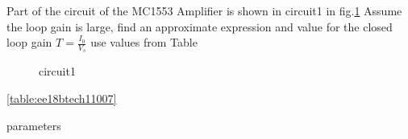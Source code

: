 \begin{enumerate}[label=\thesubsection.\arabic*.,ref=\thesubsection.\theenumi]
{\small
 \item Part of the circuit of the MC1553 Amplifier is shown in circuit1 in  fig.\ref{fig:circuit1} Assume the loop gain is large, find an approximate expression and value for the closed loop gain $T=\frac{I_0}{V_s}$ use values from Table
 \begin{figure}[!ht]
	\begin{center}
		
		\resizebox{\columnwidth}{!}{}
	\end{center}
\caption{circuit1}
\label{fig:circuit1}
\end{figure}
 \ref{table:ee18btech11007}
\begin{table}[!ht]
\centering

\caption{parameters}
\label{table:ee18btech11007}
\end{table}
\begin{figure}[!ht]
	\begin{center}
		

\end{center}
\end{figure}}
\end{enumerate}
